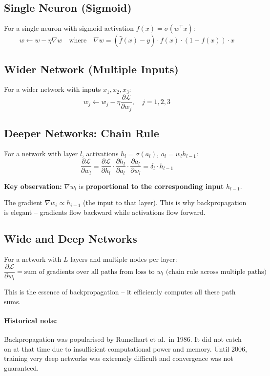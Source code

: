 \documentclass[12pt,a4paper]{article}
\newcommand{\Loss}{\mathcal{L}}
\begin{document}
\subsection{Single Neuron (Sigmoid)}

For a single neuron with sigmoid activation $f(x) = \sigma(w^\top x)$:
\[
  w \leftarrow w - \eta\nabla w
  \quad\text{where}\quad
  \nabla w = (\hat{f}(x) - y)\cdot f(x)\cdot(1-f(x))\cdot x
\]

\subsection{Wider Network (Multiple Inputs)}

For a wider network with inputs $x_1, x_2, x_3$:
\[
  w_j \leftarrow w_j - \eta\frac{\partial\Loss}{\partial w_j},
  \quad j = 1, 2, 3
\]

\subsection{Deeper Networks: Chain Rule}

For a network with layer $l$, activations $h_l = \sigma(a_l)$, $a_l = w_l h_{l-1}$:
\[
  \frac{\partial\Loss}{\partial w_l}
  = \frac{\partial\Loss}{\partial h_l}
    \cdot \frac{\partial h_l}{\partial a_l}
    \cdot \frac{\partial a_l}{\partial w_l}
  = \delta_l \cdot h_{l-1}
\]

\begin{keybox}
\textbf{Key observation:} $\nabla w_l$ is \textbf{proportional to the corresponding input} $h_{l-1}$.

The gradient $\nabla w_i \propto h_{i-1}$ (the input to that layer). This is why backpropagation is elegant -- gradients flow backward while activations flow forward.
\end{keybox}

\subsection{Wide and Deep Networks}

For a network with $L$ layers and multiple nodes per layer:
\[
  \frac{\partial\Loss}{\partial w_l}
  = \text{sum of gradients over all paths from loss to } w_l \text{ (chain rule across multiple paths)}
\]

This is the essence of backpropagation -- it efficiently computes all these path sums.

\paragraph{Historical note:} Backpropagation was popularised by Rumelhart et al.\ in 1986. It did not catch on at that time due to insufficient computational power and memory. Until 2006, training very deep networks was extremely difficult and convergence was not guaranteed.
\end{document}
